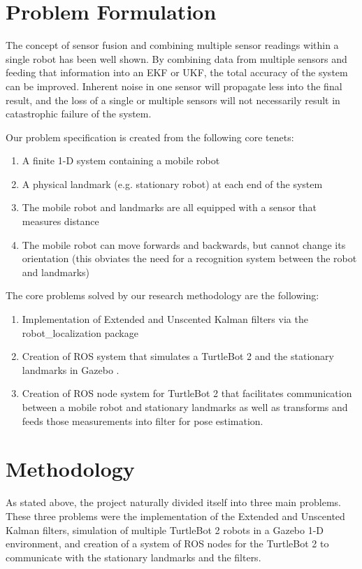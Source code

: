 \documentclass[conference]{IEEEtran} \usepackage[T1]{fontenc} \usepackage[backend=biber, style=ieee]{biblatex}
\begin{document}
\section{Problem Formulation} \label{Problem Formulation}
The concept of sensor fusion and combining multiple sensor readings within a single robot has been well shown. By
combining data from multiple sensors and feeding that information into an EKF or UKF, the total accuracy of the system
can be improved. Inherent noise in one sensor will propagate less into the final result, and the loss of a single or
multiple sensors will not necessarily result in catastrophic failure of the system.

Our problem specification is created from the following core tenets:
\begin{enumerate} 
\item A finite 1-D system containing a mobile robot 
\item A physical landmark (e.g. stationary robot) at each end of the system
\item The mobile robot and landmarks are all equipped with a sensor that measures distance 
\item The mobile robot can move forwards and backwards, but cannot change its orientation (this obviates the need for a 
recognition system between the robot and landmarks)
\end{enumerate}

The core problems solved by our research methodology are the following:
\begin{enumerate}
\item Implementation of Extended and Unscented Kalman filters via the robot\_localization package \cite{robot_localization}
\item Creation of ROS system that simulates a TurtleBot 2 and the stationary landmarks in Gazebo \cite{gazebo}.
\item Creation of ROS node system for TurtleBot 2 that facilitates communication between a mobile robot and stationary 
landmarks as well as transforms and feeds those measurements into filter for pose estimation. 
\end{enumerate} 

\section{Methodology} \label{Methodology} As stated above, the project naturally divided itself into three main
problems. These three problems were the implementation of the Extended and Unscented Kalman filters, simulation of multiple
TurtleBot 2 robots in a Gazebo 1-D environment, and creation of a system of ROS nodes for the TurtleBot 2 to communicate with
the stationary landmarks and the filters.
\end{document}
